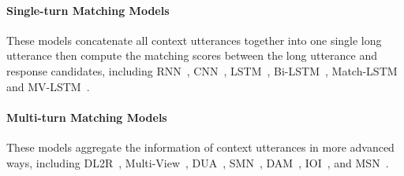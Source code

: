 \documentclass[11pt,a4paper]{article}
\begin{document}
	\paragraph{Single-turn Matching Models} These models concatenate all context utterances together into one single long utterance then compute the matching scores between the long utterance and response candidates, including RNN~\cite{lowe2015ubuntu}, CNN~\cite{lowe2015ubuntu}, LSTM~\cite{lowe2015ubuntu}, Bi-LSTM~\cite{kadlec2015improved}, Match-LSTM~\cite{wang2016learning} and MV-LSTM~\cite{wan2016match}.
	\paragraph{Multi-turn Matching Models} These models aggregate the information of context utterances in more advanced ways, including DL2R~\cite{yan2016learning}, Multi-View~\cite{zhou2016multi}, DUA~\cite{zhang2018modeling}, SMN~\cite{wu2017sequential}, DAM~\cite{zhou2018multi}, IOI~\cite{tao2019one}, and MSN~\cite{yuan2019multi}.
\end{document}
